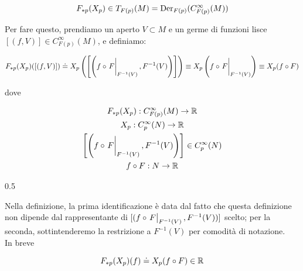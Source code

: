 \begin{equation}
	F_{*p}(X_{p}) \in T_{F(p)}(M) = \operatorname{Der}_{F(p)}(C_{F(p)}^{\infty}(M))
\end{equation}

Per fare questo, prendiamo un aperto $ V \subset M $ e un germe di funzioni lisce $ [(f,V)] \in C_{F(p)}^{\infty}(M) $, e definiamo:

\begin{equation}
	F_{*p}(X_{p})([(f,V)]) \doteq X_{p} \left( \left[ \left( f \circ \eval{F}_{F^{-1}(V)}, F^{-1}(V) \right) \right] \right) %
	\equiv X_{p} \left( f \circ \eval{F}_{F^{-1}(V)} \right) %
	\equiv X_{p}(f \circ F)
\end{equation}

dove

\begin{gather}
	F_{*p}(X_{p}) : C_{F(p)}^{\infty}(M) \to \R\\
	X_{p} : C_{p}^{\infty}(N) \to \R\\
	\left[ \left( f \circ \eval{F}_{F^{-1}(V)}, F^{-1}(V) \right) \right] \in C_{p}^{\infty}(N)\\
	f \circ F : N \to \R
\end{gather}

	{0.5}{%
			}

Nella definizione, la prima identificazione è data dal fatto che questa definizione non dipende dal rappresentante di $ [(f \circ \eval{F}_{F^{-1}(V)}, F^{-1}(V))] $ scelto; per la seconda, sottintenderemo la restrizione a $ F^{-1}(V) $ per comodità di notazione.\\
In breve

\begin{equation}
	F_{*p}(X_{p})(f) \doteq X_{p}(f \circ F) \in \mathbb{R}
\end{equation}

